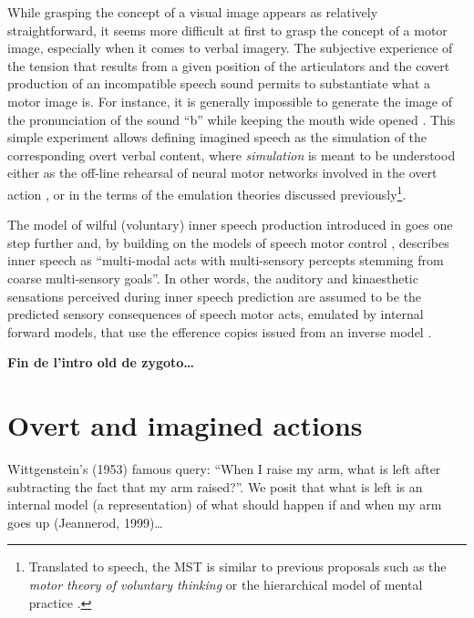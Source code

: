 \documentclass[a4paper,12pt,oneside,oldfontcommands]{memoir}
\let\rmarkdownfootnote\footnote%
\def\footnote{\protect\rmarkdownfootnote}
\begin{document}
While grasping the concept of a visual image appears as relatively
straightforward, it seems more difficult at first to grasp the concept
of a motor image, especially when it comes to verbal imagery. The
subjective experience of the tension that results from a given position
of the articulators and the covert production of an incompatible speech
sound permits to substantiate what a motor image is. For instance, it is
generally impossible to generate the image of the pronunciation of the
sound ``b'' while keeping the mouth wide opened
\citep[e.g.,][]{binet_psychologie_1886, stricker_studien_1880}. This
simple experiment allows defining imagined speech as the simulation of
the corresponding overt verbal content, where \emph{simulation} is meant
to be understood either as the off-line rehearsal of neural motor
networks involved in the overt action \citep{jeannerod_motor_2006}, or
in the terms of the emulation theories discussed previously\footnote{Translated
  to speech, the MST is similar to previous proposals such as the
  \emph{motor theory of voluntary thinking} \citep{cohen_motor_1986} or
  the hierarchical model of mental practice \citep{mackay_problem_1981}.}.

The model of wilful (voluntary) inner speech production introduced in
\citet{loevenbruck_cognitive_2018} goes one step further and, by
building on the models of speech motor control
\citep[e.g.,][]{houde_speech_2011, wolpert_internal_1995}, describes
inner speech as ``multi-modal acts with multi-sensory percepts stemming
from coarse multi-sensory goals''. In other words, the auditory and
kinaesthetic sensations perceived during inner speech prediction are
assumed to be the predicted sensory consequences of speech motor acts,
emulated by internal forward models, that use the efference copies
issued from an inverse model \citep[this proposal shares similarities
with the emulation model of motor imagery discussed
earlier,][]{grush_emulation_2004}.

\textbf{Fin de l'intro old de zygoto\ldots{}}

\section{Overt and imagined actions}\label{overt-and-imagined-actions}

Wittgenstein's (1953) famous query: ``When I raise my arm, what is left
after subtracting the fact that my arm raised?''. We posit that what is
left is an internal model (a representation) of what should happen if
and when my arm goes up (Jeannerod, 1999)\ldots{}
\end{document}
